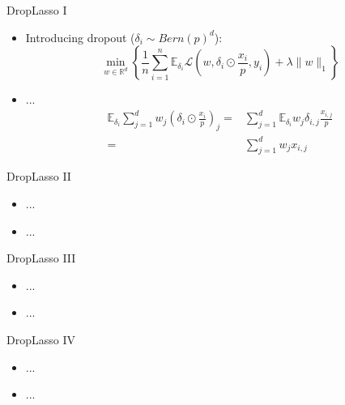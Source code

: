 \documentclass{beamer}
\newcommand{\R}{\mathbb{R}}
\newcommand{\E}{\mathbb{E}}
\newcommand{\lik}{\mathcal{L}}
\begin{document}
\begin{frame}{DropLasso I}

\begin{itemize}
  \itemsep12pt
  \item Introducing dropout ($\delta_i \sim Bern(p)^d$):
    \[
      \min_{w \in \R^d} \left\{ \frac{1}{n} \sum_{i = 1}^n \E_{\delta_i}
        \lik \left(w, \delta_i \odot \frac{x_i}{p}, y_i \right) + \lambda
        \lVert w \rVert_1 \right\}
    \]
  \item ...
    \[
      \begin{aligned}
      \E_{\delta_i} \sum_{j = 1}^{d} w_j \left( \delta_i \odot \frac{x_i}{p}
      \right)_j =& \sum_{j = 1}^d \E_{\delta_i} w_j \delta_{i,j}
      \frac{x_{i,j}}{p} \\ =& \sum_{j = 1}^d w_j x_{i,j}
      \end{aligned}
    \]
\end{itemize}

\end{frame}


\begin{frame}{DropLasso II}

\begin{itemize}
  \itemsep12pt
  \item ...
  \item ...
\end{itemize}

\end{frame}


\begin{frame}{DropLasso III}

\begin{itemize}
  \itemsep12pt
  \item ...
  \item ...
\end{itemize}

\end{frame}


\begin{frame}{DropLasso IV}

\begin{itemize}
  \itemsep12pt
  \item ...
  \item ...
\end{itemize}

\end{frame}
\end{document}
